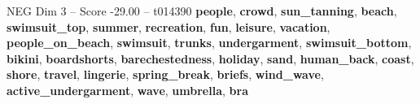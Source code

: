 \begin{textsample}{NEG Dim 3 – Score -29.00 – t014390}  \label{ex:f3_neg_005}
\textbf{people}, \textbf{crowd}, \textbf{sun\_tanning}, \textbf{beach}, \textbf{swimsuit\_top}, \textbf{summer}, \textbf{recreation}, \textbf{fun}, \textbf{leisure}, \textbf{vacation}, \textbf{people\_on\_beach}, \textbf{swimsuit}, \textbf{trunks}, \textbf{undergarment}, \textbf{swimsuit\_bottom}, \textbf{bikini}, \textbf{boardshorts}, \textbf{barechestedness}, \textbf{holiday}, \textbf{sand}, \textbf{human\_back}, \textbf{coast}, \textbf{shore}, \textbf{travel}, \textbf{lingerie}, \textbf{spring\_break}, \textbf{briefs}, \textbf{wind\_wave}, \textbf{active\_undergarment}, \textbf{wave}, \textbf{umbrella}, \textbf{bra}

\end{textsample}
